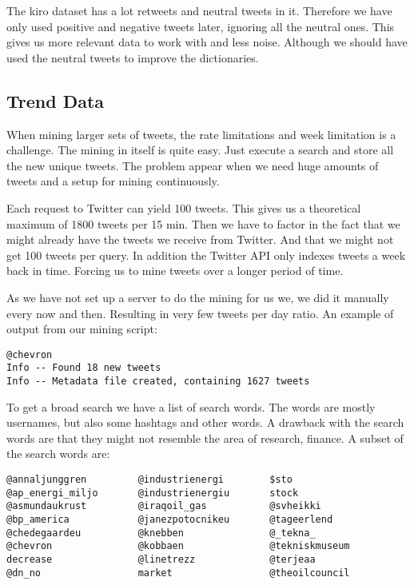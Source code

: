 The kiro dataset has a lot retweets and neutral tweets in it. Therefore we have
only used positive and negative tweets later, ignoring all the neutral ones.
This gives us more relevant data to work with and less noise. Although we
should have used the neutral tweets to improve the dictionaries.
%

\subsection{Trend Data}\label{data:trend_data}
When mining larger sets of tweets, the rate limitations and week limitation is
a challenge. The mining in itself is quite easy. Just execute a search and store
all the new unique tweets. The problem appear when we need huge amounts of
tweets and a setup for mining continuously. 

Each request to Twitter can yield 100 tweets. This gives us a theoretical
maximum of 1800 tweets per 15 min. Then we have to factor in the fact that we
might already have the tweets we receive from Twitter. And that we might not
get 100 tweets per query. In addition the Twitter API only indexes tweets a
week back in time. Forcing us to mine tweets over a longer period of time.  

As we have not set up a server to do the mining for us we, we did it manually
every now and then. Resulting in very few tweets per day ratio. 
An example of output from our mining script:
\begin{verbatim}
@chevron
Info -- Found 18 new tweets
Info -- Metadata file created, containing 1627 tweets
\end{verbatim} 

To get a broad search we have a list of search words. The words are mostly
usernames, but also some hashtags and other words. A drawback with the search
words are that they might not resemble the area of research, finance.  
A subset of the search words are:
\begin{verbatim}
@annaljunggren         @industrienergi        $sto
@ap_energi_miljo       @industrienergiu       stock
@asmundaukrust         @iraqoil_gas           @svheikki
@bp_america            @janezpotocnikeu       @tageerlend
@chedegaardeu          @knebben               @_tekna_
@chevron               @kobbaen               @tekniskmuseum
decrease               @linetrezz             @terjeaa
@dn_no                 market                 @theoilcouncil
\end{verbatim}

